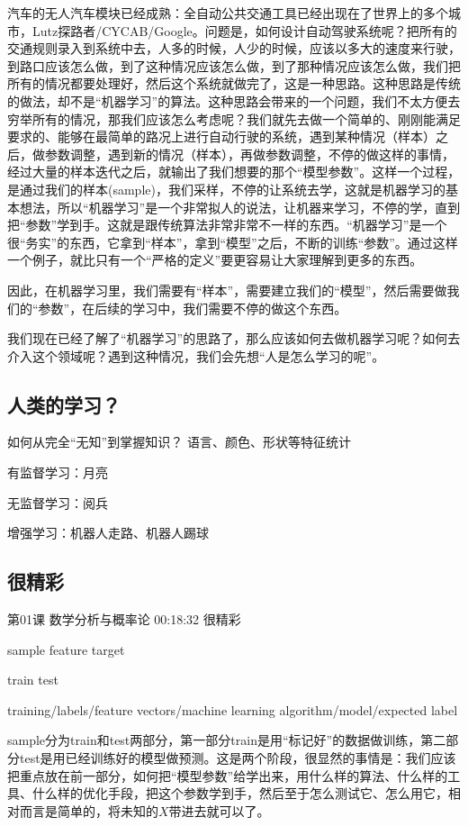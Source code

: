 \documentclass[UTF8]{ctexbook}
\begin{document}
汽车的无人汽车模块已经成熟：全自动公共交通工具已经出现在了世界上的多个城市，Lutz探路者/CYCAB/Google。问题是，如何设计自动驾驶系统呢？把所有的交通规则录入到系统中去，人多的时候，人少的时候，应该以多大的速度来行驶，到路口应该怎么做，到了这种情况应该怎么做，到了那种情况应该怎么做，我们把所有的情况都要处理好，然后这个系统就做完了，这是一种思路。这种思路是传统的做法，却不是“机器学习”的算法。这种思路会带来的一个问题，我们不太方便去穷举所有的情况，那我们应该怎么考虑呢？我们就先去做一个简单的、刚刚能满足要求的、能够在最简单的路况上进行自动行驶的系统，遇到某种情况（样本）之后，做参数调整，遇到新的情况（样本），再做参数调整，不停的做这样的事情，经过大量的样本迭代之后，就输出了我们想要的那个“模型参数”。这样一个过程，是通过我们的样本(sample)，我们采样，不停的让系统去学，这就是机器学习的基本想法，所以“机器学习”是一个非常拟人的说法，让机器来学习，不停的学，直到把“参数”学到手。这就是跟传统算法非常非常不一样的东西。“机器学习”是一个很“务实”的东西，它拿到“样本”，拿到“模型”之后，不断的训练“参数”。通过这样一个例子，就比只有一个“严格的定义”要更容易让大家理解到更多的东西。

因此，在机器学习里，我们需要有“样本”，需要建立我们的“模型”，然后需要做我们的“参数”，在后续的学习中，我们需要不停的做这个东西。

我们现在已经了解了“机器学习”的思路了，那么应该如何去做机器学习呢？如何去介入这个领域呢？遇到这种情况，我们会先想“人是怎么学习的呢”。

\subsection{人类的学习？}

如何从完全“无知”到掌握知识？ 语言、颜色、形状等特征统计

有监督学习：月亮

无监督学习：阅兵

增强学习：机器人走路、机器人踢球

\subsection{很精彩}

第01课 数学分析与概率论 00:18:32 很精彩

sample feature target

train test

training/labels/feature vectors/machine learning algorithm/model/expected label

sample分为train和test两部分，第一部分train是用“标记好”的数据做训练，第二部分test是用已经训练好的模型做预测。这是两个阶段，很显然的事情是：我们应该把重点放在前一部分，如何把“模型参数”给学出来，用什么样的算法、什么样的工具、什么样的优化手段，把这个参数学到手，然后至于怎么测试它、怎么用它，相对而言是简单的，将未知的$X$带进去就可以了。
\end{document}
